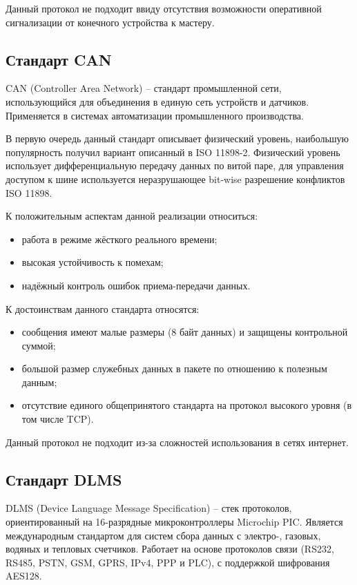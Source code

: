 Данный протокол не подходит ввиду отсутствия возможности оперативной сигнализации от конечного устройства к мастеру.

\subsection{Стандарт CAN}

CAN (Controller Area Network) – стандарт промышленной сети, использующийся для объединения в единую сеть устройств и датчиков. Применяется в системах автоматизации промышленного производства. 

В первую очередь данный стандарт описывает физический уровень, наибольшую популярность получил вариант описанный в ISO 11898-2. Физический уровень использует дифференциальную передачу данных по витой паре, для управления доступом к шине используется неразрушающее bit-wise разрешение конфликтов ISO 11898.

К положительным аспектам данной реализации относиться:

\begin{itemize}
 \item работа в режиме жёсткого реального времени;
 \item высокая устойчивость к помехам;
 \item надёжный контроль ошибок приема-передачи данных.
\end{itemize}

К достоинствам данного стандарта относятся:

\begin{itemize}
 \item сообщения имеют малые размеры (8 байт данных) и защищены контрольной суммой;
 \item большой размер служебных данных в пакете по отношению к полезным данным;
 \item отсутствие единого общепринятого стандарта на протокол высокого уровня (в том числе TCP).
\end{itemize}

Данный протокол не подходит из-за сложностей использования в сетях интернет.

\subsection{Стандарт DLMS}

DLMS (Device Language Message Specification) – стек протоколов, ориентированный на 16-разрядные микроконтроллеры Microchip PIC. Является международным стандартом для систем сбора данных с электро-, газовых, водяных и тепловых счетчиков. Работает на основе протоколов связи (RS232, RS485, PSTN, GSM, GPRS, IPv4, PPP и PLC), с поддержкой шифрования AES128.

